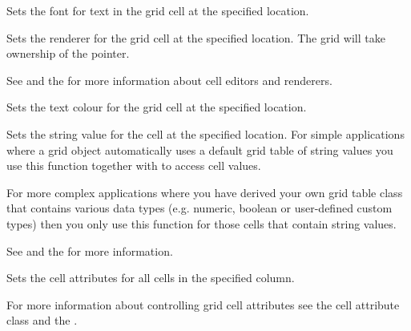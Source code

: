 {Sets the font for text in the grid cell at the specified location.

\label{wxgridsetcellrenderer}


Sets the renderer for the grid cell at the specified location. 
The grid will take ownership of the pointer.

See  and
the  for more information about cell editors and renderers.

\label{wxgridsetcelltextcolour}


Sets the text colour for the grid cell at the specified location.

\label{wxgridsetcellvalue}



Sets the string value for the cell at the specified location. For simple applications where a
grid object automatically uses a default grid table of string values you use this function together
with  to access cell values. 

For more complex applications where you have derived your own grid table class that contains
various data types (e.g. numeric, boolean or user-defined custom types) then you only use this
function for those cells that contain string values. 

See 
and the  for more information.

\label{wxgridsetcolattr}


Sets the cell attributes for all cells in the specified column.

For more information about controlling grid cell attributes see the 
 cell attribute class and the 
.

}
